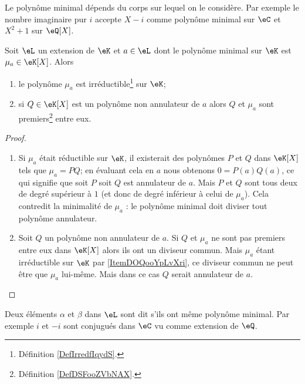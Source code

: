 \begin{example}
    Le polynôme minimal dépends du corps sur lequel on le considère. Par exemple le nombre imaginaire pur \( i\) accepte \( X-i\) comme polynôme minimal sur \( \eC\) et \( X^2+1\) sur \( \eQ[X]\).
\end{example}

\begin{proposition}  \label{PropRARooKavaIT}
    Soit \( \eL\) un extension de \( \eK\) et \( a\in \eL\) dont le polynôme minimal sur \( \eK\) est \( \mu_a\in\eK[X]\). Alors
    \begin{enumerate}
        \item   \label{ItemDOQooYpLvXri}
            le polynôme \( \mu_a\) est irréductible\footnote{Définition \ref{DefIrredfIqydS}.} sur \( \eK\);
        \item
            si \( Q\in \eK[X]\) est un polynôme non annulateur de \( a\) alors \( Q\) et \( \mu_a\) sont premiers\footnote{Définition \ref{DefDSFooZVbNAX}.} entre eux.
    \end{enumerate}
\end{proposition}

\begin{proof}
    \begin{enumerate}
        \item
            Si \( \mu_a\) était réductible sur \( \eK\), il existerait des polynômes \( P\) et \( Q\) dans \( \eK[X]\) tels que \( \mu_a=PQ\); en évaluant cela en \( a\) nous obtenons \( 0=P(a)Q(a)\), ce qui signifie que soit \( P\) soit \( Q\) est annulateur de \( a\). Mais \( P\) et \( Q\) sont tous deux de degré supérieur à \( 1\) (et donc de degré inférieur à celui de \( \mu_a\)). Cela contredit la minimalité de \( \mu_a\) : le polynôme minimal doit diviser tout polynôme annulateur.
        \item
            Soit \( Q\) un polynôme non annulateur de \( a\). Si \( Q\) et \( \mu_a\) ne sont pas premiers entre eux dans \( \eK[X]\) alors ils ont un diviseur commun. Mais \( \mu_a\) étant irréductible sur \( \eK\) par \ref{ItemDOQooYpLvXri}, ce diviseur commun ne peut être que \( \mu_a\) lui-même. Mais dans ce cas \( Q\) serait annulateur de \( a\).
    \end{enumerate}
\end{proof}

Deux éléments \( \alpha\) et \( \beta\) dans \( \eL\) sont dit  s'ils ont même polynôme minimal. Par exemple \( i\) et \( -i\) sont conjugués dans \( \eC\) vu comme extension de \( \eQ\).

